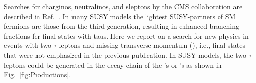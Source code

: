 Searches for charginos, neutralinos, and sleptons by the CMS collaboration are described in Ref.~\cite{Khachatryan:2014qwa,Khachatryan:2014mma,Khachatryan:2015kxa}.
In many SUSY models \cite{Martin:1997ns} the lightest SUSY-partners of SM fermions are those from the third generation,
resulting in enhanced branching fractions for final states with taus.  Here we report on a search for new physics in events
with two $\tau$ leptons and missing transverse momentum (\MPT), i.e., final states that were not emphasized in the previous publication.
In SUSY models, the two $\tau$ leptons could be generated in the decay chain of the \sTau's or \PSGcpDo's as shown in Fig.~\ref{fig:Productions}. 



